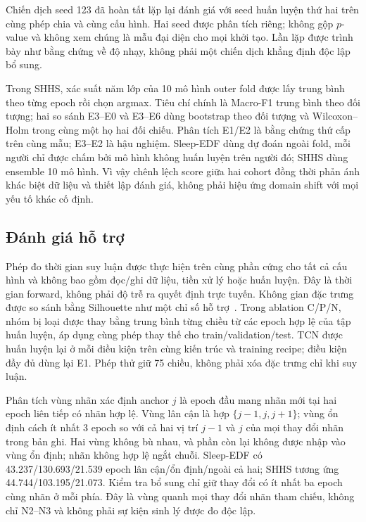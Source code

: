 \documentclass[10pt,a4paper]{article}
\begin{document}
Chiến dịch seed 123 đã hoàn tất lặp lại đánh giá với seed huấn luyện thứ hai trên cùng phép chia và cùng cấu hình. Hai seed được phân tích riêng; không gộp $p$-value và không xem chúng là mẫu đại diện cho mọi khởi tạo. Lần lặp được trình bày như bằng chứng về độ nhạy, không phải một chiến dịch khẳng định độc lập bổ sung.

Trong SHHS, xác suất năm lớp của 10 mô hình outer fold được lấy trung bình theo từng epoch rồi chọn argmax. Tiêu chí chính là Macro-F1 trung bình theo đối tượng; hai so sánh E3--E0 và E3--E6 dùng bootstrap theo đối tượng và Wilcoxon--Holm trong cùng một họ hai đối chiếu. Phân tích E1/E2 là bằng chứng thứ cấp trên cùng mẫu; E3--E2 là hậu nghiệm. Sleep-EDF dùng dự đoán ngoài fold, mỗi người chỉ được chấm bởi mô hình không huấn luyện trên người đó; SHHS dùng ensemble 10 mô hình. Vì vậy chênh lệch score giữa hai cohort đồng thời phản ánh khác biệt dữ liệu và thiết lập đánh giá, không phải hiệu ứng domain shift với mọi yếu tố khác cố định.

\subsection{Đánh giá hỗ trợ}

Phép đo thời gian suy luận được thực hiện trên cùng phần cứng cho tất cả cấu hình và không bao gồm đọc/ghi dữ liệu, tiền xử lý hoặc huấn luyện. Đây là thời gian forward, không phải độ trễ ra quyết định trực tuyến. Không gian đặc trưng được so sánh bằng Silhouette như một chỉ số hỗ trợ~\cite{rousseeuw1987silhouettes}. Trong ablation C/P/N, nhóm bị loại được thay bằng trung bình từng chiều từ các epoch hợp lệ của tập huấn luyện, áp dụng cùng phép thay thế cho train/validation/test. TCN được huấn luyện lại ở mỗi điều kiện trên cùng kiến trúc và training recipe; điều kiện đầy đủ dùng lại E1. Phép thử giữ 75 chiều, không phải xóa đặc trưng chỉ khi suy luận.

Phân tích vùng nhãn xác định anchor $j$ là epoch đầu mang nhãn mới tại hai epoch liên tiếp có nhãn hợp lệ. Vùng lân cận là hợp $\{j-1,j,j+1\}$; vùng ổn định cách ít nhất 3 epoch so với cả hai vị trí $j-1$ và $j$ của mọi thay đổi nhãn trong bản ghi. Hai vùng không bù nhau, và phần còn lại không được nhập vào vùng ổn định; nhãn không hợp lệ ngắt chuỗi. Sleep-EDF có 43.237/130.693/21.539 epoch lân cận/ổn định/ngoài cả hai; SHHS tương ứng 44.744/103.195/21.073. Kiểm tra bổ sung chỉ giữ thay đổi có ít nhất ba epoch cùng nhãn ở mỗi phía. Đây là vùng quanh mọi thay đổi nhãn tham chiếu, không chỉ N2--N3 và không phải sự kiện sinh lý được đo độc lập.
\end{document}
